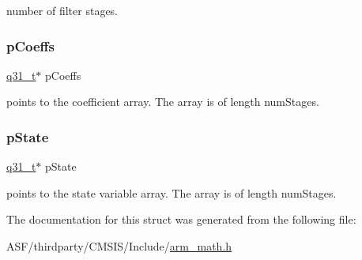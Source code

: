 number of filter stages. \mbox{\label{structarm__fir__lattice__instance__q31_a68888e36167d81cb7836db10367a1682}} 
\subsubsection{\texorpdfstring{pCoeffs}{pCoeffs}}
{\footnotesize\ttfamily \mbox{\hyperlink{arm__math_8h_adc89a3547f5324b7b3b95adec3806bc0}{q31\+\_\+t}}$\ast$ p\+Coeffs}

points to the coefficient array. The array is of length num\+Stages. \mbox{\label{structarm__fir__lattice__instance__q31_adee4ba3ee8869865af7d8fa08ca913d6}} 
\subsubsection{\texorpdfstring{pState}{pState}}
{\footnotesize\ttfamily \mbox{\hyperlink{arm__math_8h_adc89a3547f5324b7b3b95adec3806bc0}{q31\+\_\+t}}$\ast$ p\+State}

points to the state variable array. The array is of length num\+Stages. 

The documentation for this struct was generated from the following file\+:\begin{DoxyCompactItemize}
\item 
A\+S\+F/thirdparty/\+C\+M\+S\+I\+S/\+Include/\mbox{\hyperlink{arm__math_8h}{arm\+\_\+math.\+h}}\end{DoxyCompactItemize}
